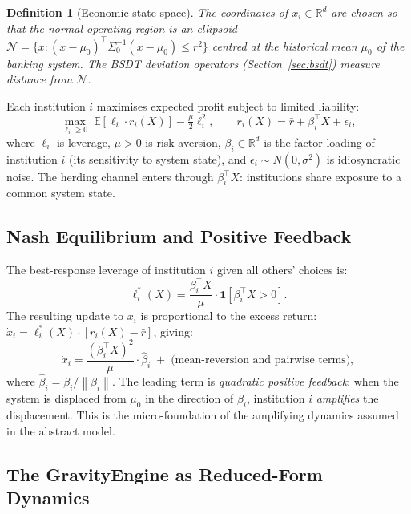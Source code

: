 \documentclass[11pt]{article}
\newtheorem{definition}[theorem]{Definition}
\theoremstyle{definition}
\newcommand{\R}{\mathbb{R}}
\newcommand{\E}{\mathbb{E}}
\newcommand{\norm}[1]{\left\|#1\right\|}
\begin{document}
\begin{definition}[Economic state space]
The coordinates of $x_i \in \R^d$ are chosen so that the \emph{normal operating
region} is an ellipsoid $\mathcal{N} = \{x : (x - \mu_0)^\top \Sigma_0^{-1}(x-\mu_0) \le r^2\}$
centred at the historical mean $\mu_0$ of the banking system.
The BSDT deviation operators (Section~\ref{sec:bsdt}) measure distance from $\mathcal{N}$.
\end{definition}

Each institution $i$ maximises expected profit subject to limited liability:
\begin{equation}\label{eq:institution_opt}
  \max_{\ell_i \ge 0}\; \E[\ell_i \cdot r_i(X)] - \tfrac{\mu}{2}\ell_i^2,
  \qquad r_i(X) = \bar r + \beta_i^\top X + \epsilon_i,
\end{equation}
where $\ell_i$ is leverage, $\mu > 0$ is risk-aversion, $\beta_i \in \R^d$ is the
factor loading of institution $i$ (its sensitivity to system state), and
$\epsilon_i \sim N(0,\sigma^2)$ is idiosyncratic noise.  The herding channel enters
through $\beta_i^\top X$: institutions share exposure to a common
system state.

\subsection{Nash Equilibrium and Positive Feedback}

The best-response leverage of institution $i$ given all others' choices is:
\[
  \ell_i^*(X) = \frac{\beta_i^\top X}{\mu} \cdot \mathbf{1}[\beta_i^\top X > 0].
\]
The resulting update to $x_i$ is proportional to the excess return:
$\dot x_i = \ell_i^*(X) \cdot [r_i(X) - \bar r]$, giving:
\begin{equation}\label{eq:micro_dynamics}
  \dot x_i = \frac{(\beta_i^\top X)^2}{\mu} \cdot \hat\beta_i
  \;+\; \text{(mean-reversion and pairwise terms)},
\end{equation}
where $\hat\beta_i = \beta_i/\norm{\beta_i}$.
The leading term is \emph{quadratic positive feedback}: when the system is displaced
from $\mu_0$ in the direction of $\beta_i$, institution $i$ \emph{amplifies} the
displacement.  This is the micro-foundation of the amplifying dynamics assumed in
the abstract model.

\subsection{The GravityEngine as Reduced-Form Dynamics}
\end{document}
